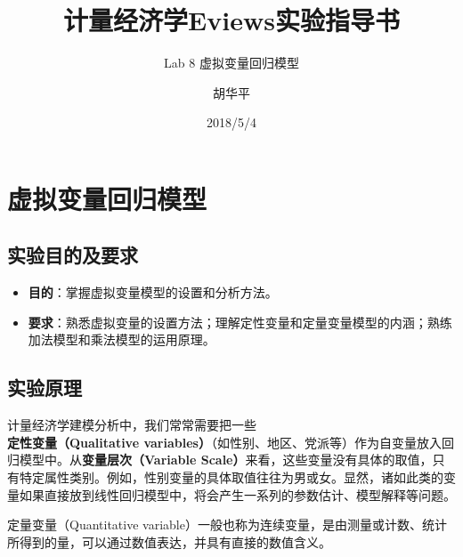 \documentclass[12pt,(landscape,a4paper),(portrait,a4paper)]{article}
\title{计量经济学Eviews实验指导书}
\subtitle{Lab 8 虚拟变量回归模型}
\author{胡华平}
\date{2018/5/4}
\makeatletter
\def\maxwidth{\ifdim\Gin@nat@width>\linewidth\linewidth\else\Gin@nat@width\fi}
\providecommand{\tightlist}{%
  \setlength{\itemsep}{0pt}\setlength{\parskip}{0pt}}
\let\stdsection\section
\renewcommand\section{\newpage\stdsection}
\theoremstyle{definition}
\theoremstyle{definition}
\theoremstyle{definition}
\theoremstyle{remark}
\let\BeginKnitrBlock\begin \let\EndKnitrBlock\end
\makeatother
\begin{document}
\maketitle

\renewcommand{\figurename}{图}
\renewcommand{\contentsname}{目录}
\renewcommand{\tablename}{表}


\makeatletter
\def\maxwidth{ %
  \ifdim\Gin@nat@width>\linewidth
    \linewidth
  \else
    \Gin@nat@width
  \fi
}
\makeatother

{
\setcounter{tocdepth}{5}
\tableofcontents
}
\newpage

\hypertarget{dummy-variable}{%
\section{虚拟变量回归模型}\label{dummy-variable}}

\subsection{实验目的及要求}

\begin{itemize}
\tightlist
\item
  \textbf{目的}：掌握虚拟变量模型的设置和分析方法。
\item
  \textbf{要求}：熟悉虚拟变量的设置方法；理解定性变量和定量变量模型的内涵；熟练加法模型和乘法模型的运用原理。
\end{itemize}

\subsection{实验原理}

计量经济学建模分析中，我们常常需要把一些\textbf{定性变量（Qualitative
variables）}（如性别、地区、党派等）作为自变量放入回归模型中。从\textbf{变量层次（Variable
Scale）}来看，这些变量没有具体的取值，只有特定属性类别。例如，性别变量的具体取值往往为男或女。显然，诸如此类的变量如果直接放到线性回归模型中，将会产生一系列的参数估计、模型解释等问题。

\BeginKnitrBlock{definition}[定量变量]
\protect\hypertarget{def:var-quanty}{}{\label{def:var-quanty}
{} }定量变量（Quantitative
variable）一般也称为连续变量，是由测量或计数、统计所得到的量，可以通过数值表达，并具有直接的数值含义。
\EndKnitrBlock{definition}
\end{document}
